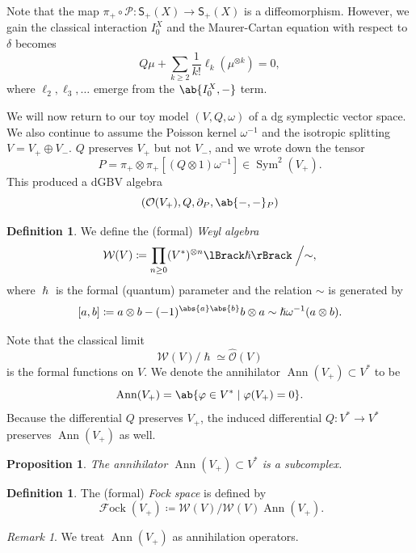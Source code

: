 \documentclass{amsart}
\newtheorem{prop}[thm]{Proposition}
\theoremstyle{definition}
\newtheorem{defn}[thm]{Definition}
\theoremstyle{remark}
\newtheorem{rmk}[thm]{Remark}
\theoremstyle{plain}
\theoremstyle{definition}
\theoremstyle{remark}
\newcommand{\mc}[1]{\mathcal{#1}}
\newcommand{\on}[1]{\operatorname{#1}}
\newcommand{\ms}[1]{\mathsf{#1}}
\newcommand{\1}{\mathbf{1}}
\newcommand{\2}{\mathbf{2}}
\newcommand{\3}{\mathbf{3}}
\newcommand{\ps}[1]{\lBrack #1 \rBrack}
\DeclareMathOperator{\Sym}{Sym}
\DeclareMathOperator{\Fock}{\mc{F}ock}
\begin{document}
Note that the map \(\pi_+ \circ \mc{P} \colon \ms{S}_+(X) \to \ms{S}_+(X)\) is a diffeomorphism. However, we gain the classical interaction \(I_0^X\) and the Maurer-Cartan equation with respect to \(\delta\) becomes
\[ Q \mu + \sum_{k \geq 2} \frac{1}{k!} \ell_k (\mu^{\otimes k}) = 0, \]
where \(\ell_2, \ell_3, \ldots\) emerge from the \(\ab\{ I_0^X, -\}\) term.

We will now return to our toy model \((V, Q, \omega)\) of a dg symplectic vector space. We also continue to assume the Poisson kernel \(\omega^{-1}\) and the isotropic splitting \(V = V_+ \oplus V_-\). \(Q\) preserves \(V_+\) but not \(V_-\), and we wrote down the tensor
\[ P = \pi_+ \otimes \pi_+ [(Q \otimes 1)\omega^{-1}] \in \Sym^2(V_+). \]
This produced a dGBV algebra
\[ (\mc{O}(V_+), Q, \partial_P, \ab\{-,-\}_P) \]

\begin{defn}
    We define the (formal) \textit{Weyl algebra} 
    \[ \mc{W}(V) \coloneqq \prod_{n \geq 0} (V^*)^{\otimes n} \ps{\hslash} \Bigm/ \sim, \]
    where \(\hslash\) is the formal (quantum) parameter and the relation \(\sim\) is generated by
    \[ [a,b] \coloneqq a \otimes b - (-1)^{\abs{a}\abs{b}} b \otimes a \sim \hslash \omega^{-1}(a \otimes b). \]
\end{defn}

Note that the classical limit
\[ \mc{W}(V) / \hslash \simeq \hat{\mc{O}}(V) \]
is the formal functions on \(V\). We denote the annihilator \(\on{Ann}(V_+) \subset V^*\) to be 
\[ \on{Ann}(V_+) = \ab\{ \varphi \in V^* \mid \varphi(V_+) = 0 \}. \]
Because the differential \(Q\) preserves \(V_+\), the induced differential \(Q \colon V^* \to V^*\) preserves \(\on{Ann}(V_+)\) as well.

\begin{prop}
    The annihilator \(\on{Ann}(V_+) \subset V^*\) is a subcomplex.
\end{prop}

\begin{defn}
    The (formal) \textit{Fock space} is defined by
    \[ \Fock(V_+) \coloneqq \mc{W}(V) / \mc{W}(V) \on{Ann}(V_+). \]
\end{defn}

\begin{rmk}
    We treat \(\on{Ann}(V_+)\) as annihilation operators.
\end{rmk}
\end{document}

